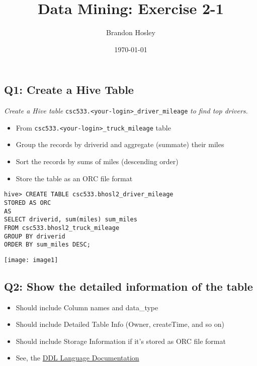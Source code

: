 \documentclass[]{article}
\title{Data Mining: Exercise 2-1}
\author{Brandon Hosley}
\date{\today}
\begin{document}
\maketitle

\vspace{3em}

\subsection*{Q1: Create a Hive Table}
\emph{Create a Hive table}
\texttt{csc533.<your-login>_driver_mileage}
\emph{to find top drivers.} \\
	\begin{itemize}[before=\itshape,font=\normalfont]
		\item From \textnormal{\texttt{csc533.<your-login>_truck_mileage}} table
		\item Group the records by driverid and aggregate (summate) their miles
		\item Sort the records by sums of miles (descending order)
		\item Store the table as an ORC file format
	\end{itemize} 

\begin{verbatim}
hive> CREATE TABLE csc533.bhosl2_driver_mileage
STORED AS ORC
AS
SELECT driverid, sum(miles) sum_miles
FROM csc533.bhosl2_truck_mileage
GROUP BY driverid
ORDER BY sum_miles DESC;
\end{verbatim}
\texttt{[image: image1]}

\subsection*{Q2: Show the detailed information of the table}
\begin{itemize}[before=\itshape,font=\normalfont]
	\item Should include Column names and data\_type
	\item Should include Detailed Table Info (Owner, createTime, and so on)
	\item Should include Storage Information if it’s stored as ORC file format
	\item See, the \href{https://cwiki.apache.org/confluence/display/Hive/LanguageManual+DDL#LanguageMan
		ualDDL-DescribeTable/View/MaterializedView/Column}{DDL Language Documentation}
\end{itemize} 
\end{document}
